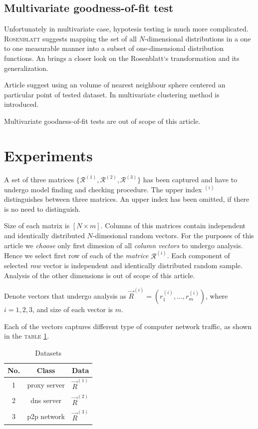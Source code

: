 \documentclass[a4paper,journal]{IEEEtran}
\begin{document}
\subsection{Multivariate goodness-of-fit test}
Unfortunately in multivariate case, hypotesis testing is much more complicated. \textsc{Rosenblatt} \cite{Ros62} suggests 
mapping the set of all $N$-dimensional distributions in a one to one measurable manner into a subset of one-dimensional
distribution functions. An \cite{Bro08} brings a closer look on the Rosenblatt`s transformation and its generalization.

Article \cite{BicBre83} suggest using an volume of nearest neighbour sphere centered an particular point of tested dataset.
In \cite{Nar03} multivariate clustering method is introduced.

Multivariate goodness-of-fit tests are out of scope of this article.%

\section{Experiments}\label{sec:exp}
A set of three matrices  $\{\mathcal{R}^{(1)},\mathcal{R}^{(2)},\mathcal{R}^{(3)}\}$ has been captured and
have to undergo model finding and checking procedure. The upper index $^{(i)}$ distinguishes between three matrices.
An upper index has been omitted, if there is no need to distinguish.

Size of each matrix is $[N \times m]$.
Columns of this matrices contain independent and identically distributed $N$-dimesional random vectors.
For the purposes of this article we \emph{choose} only first dimesion of all \emph{column vectors} to undergo analysis.
Hence we select first row of each of the \emph{matrice} $\mathcal{R}^{(i)}$.
Each component of selected \emph{row} vector is independent and identically distributed random sample.
Analysis of the other dimensions is out of scope of this article.

Denote vectors that undergo analysis as ${\vec R^{(i)}}=( r^{(i)}_1,\ldots,r^{(i)}_{m})$, 
where $i=1,2,3$, and  size of each vector is $m$.

Each of the vectors captures different type of computer network traffic, as shown in the
\textsc{table \ref{tbl:data}}.

\begin{table}[!h]
\caption{Datasets}
\begin{center}
\begin{tabular}{|c|c|c|}\hline
\textbf{No.} & \textbf{Class} & \textbf{Data} \\ \hline
1 & proxy server & $\vec{R}^{(1)}$ \\ \hline
2 & dns server & $\vec{R}^{(2)}$ \\ \hline
3 & p2p network & $\vec{R}^{(3)}$ \\ \hline
\end{tabular}
\end{center}
\label{tbl:data}
\end{table}
\end{document}

